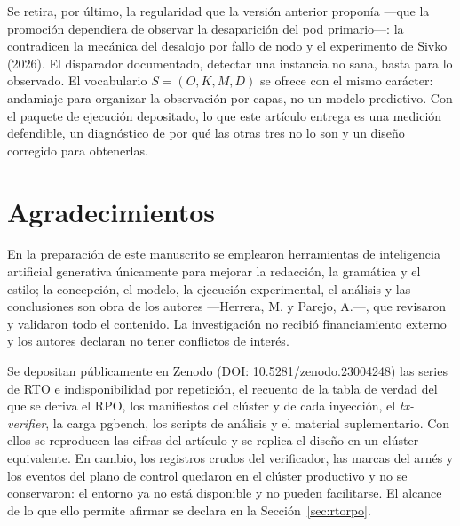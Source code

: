 \documentclass[12pt,twocolumn,letterpaper]{article}
\begin{document}
Se retira, por último, la regularidad que la versión anterior proponía —que la promoción dependiera de observar la desaparición del pod primario—: la contradicen la mecánica del desalojo por fallo de nodo y el experimento de Sivko (2026). El disparador documentado, detectar una instancia no sana, basta para lo observado. El vocabulario $S=(O,K,M,D)$ se ofrece con el mismo carácter: andamiaje para organizar la observación por capas, no un modelo predictivo. Con el paquete de ejecución depositado, lo que este artículo entrega es una medición defendible, un diagnóstico de por qué las otras tres no lo son y un diseño corregido para obtenerlas.

\section*{Agradecimientos}
En la preparación de este manuscrito se emplearon herramientas de inteligencia artificial generativa únicamente para mejorar la redacción, la gramática y el estilo; la concepción, el modelo, la ejecución experimental, el análisis y las conclusiones son obra de los autores —Herrera, M. y Parejo, A.—, que revisaron y validaron todo el contenido. La investigación no recibió financiamiento externo y los autores declaran no tener conflictos de interés.

Se depositan públicamente en Zenodo (DOI: 10.5281/\allowbreak zenodo.23004248) las series de RTO e indisponibilidad por repetición, el recuento de la tabla de verdad del que se deriva el RPO, los manifiestos del clúster y de cada inyección, el \textit{tx-verifier}, la carga pgbench, los scripts de análisis y el material suplementario. Con ellos se reproducen las cifras del artículo y se replica el diseño en un clúster equivalente. En cambio, los registros crudos del verificador, las marcas del arnés y los eventos del plano de control quedaron en el clúster productivo y no se conservaron: el entorno ya no está disponible y no pueden facilitarse. El alcance de lo que ello permite afirmar se declara en la Sección~\ref{sec:rtorpo}.

\end{document}
